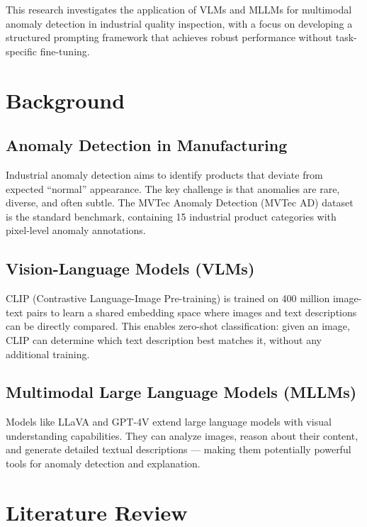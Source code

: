 \documentclass[12pt, a4paper]{article}
\begin{document}
This research investigates the application of VLMs and MLLMs for multimodal anomaly detection in industrial quality inspection, with a focus on developing a structured prompting framework that achieves robust performance without task-specific fine-tuning.

\section{Background}

\subsection{Anomaly Detection in Manufacturing}

Industrial anomaly detection aims to identify products that deviate from expected ``normal'' appearance. The key challenge is that anomalies are rare, diverse, and often subtle. The MVTec Anomaly Detection (MVTec AD) dataset \cite{bergmann2019mvtec} is the standard benchmark, containing 15 industrial product categories with pixel-level anomaly annotations.

\subsection{Vision-Language Models (VLMs)}

CLIP (Contrastive Language-Image Pre-training) \cite{radford2021clip} is trained on 400 million image-text pairs to learn a shared embedding space where images and text descriptions can be directly compared. This enables zero-shot classification: given an image, CLIP can determine which text description best matches it, without any additional training.

\subsection{Multimodal Large Language Models (MLLMs)}

Models like LLaVA \cite{liu2023llava} and GPT-4V extend large language models with visual understanding capabilities. They can analyze images, reason about their content, and generate detailed textual descriptions --- making them potentially powerful tools for anomaly detection and explanation.

\section{Literature Review}
\end{document}
